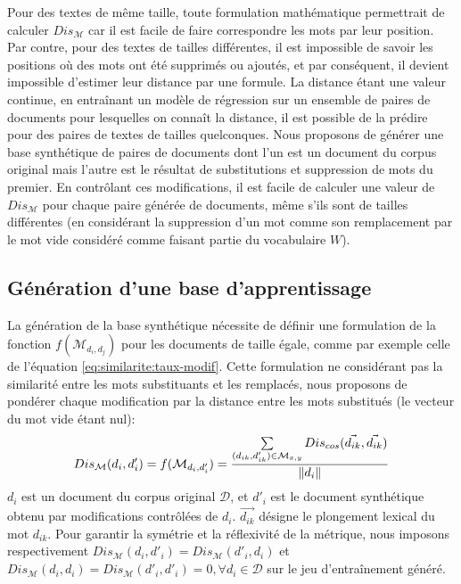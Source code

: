 Pour des textes de même taille, toute formulation mathématique permettrait de calculer $Dis_\mathcal{M}$ car il est facile de faire correspondre les mots par leur position. Par contre, pour des textes de tailles différentes, il est impossible de savoir les positions où des mots ont été supprimés ou ajoutés, et par conséquent, il devient impossible d'estimer leur distance par une formule. La distance étant une valeur continue, en entraînant un modèle de régression sur un ensemble de paires de documents pour lesquelles on connaît la distance, il est possible de la prédire pour des paires de textes de tailles quelconques. Nous proposons de générer une base synthétique de paires de documents dont l'un est un document du corpus original mais l'autre est le résultat de substitutions et suppression de mots du premier. En contrôlant ces modifications, il est facile de calculer une valeur de $Dis_\mathcal{M}$ pour chaque paire générée de documents, même s'ils sont de tailles différentes (en considérant la suppression d'un mot comme son remplacement par le \og mot vide \fg{} considéré comme faisant partie du vocabulaire $W$).

\subsection{Génération d'une base d'apprentissage}
La génération de la base synthétique nécessite de définir une formulation de la fonction $f(\mathcal{M}_{d_i, d_j})$ pour les documents de taille égale, comme par exemple celle de l'équation \ref{eq:similarite:taux-modif}. Cette formulation ne considérant pas la similarité entre les mots substituants et les remplacés, nous proposons de pondérer chaque modification par la distance entre les mots substitués (le vecteur du  \og mot vide \fg{} étant nul):
\begin{equation}
{Dis_\mathcal{M}}(d_i, d'_i) = {f}(\mathcal{M}_{d_i, d'_i}) = \frac{\sum\limits_{(d_{ik}, d'_{ik}) \in \mathcal{M}_{x,y}} Dis_{cos}(\vec{d_{ik}}, \vec{d_{ik}})}{\left\lVert d_i\right\rVert} \label{equation:similarite:somme-dist-mots}
\end{equation}
$d_i$ est un document du corpus original $\mathcal{D}$, et $d'_i$ est le document synthétique obtenu par modifications contrôlées de $d_i$. $\vec{d_{ik}}$ désigne le plongement lexical du mot $d_{ik}$. Pour garantir la symétrie et la réflexivité de la métrique, nous imposons respectivement ${Dis_\mathcal{M}}(d_i, d'_i) = {Dis_\mathcal{M}}(d'_i, d_i)$ et ${Dis_\mathcal{M}}(d_i, d_i) = {Dis_\mathcal{M}}(d'_i, d'_i) = 0, \forall d_i \in \mathcal{D}$ sur le jeu d'entraînement généré. 

